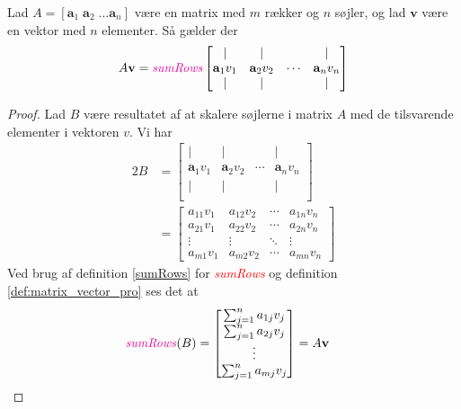 \begin{theorem} \label{matrix_vector_pro}
    Lad $A = [\mathbf{a}_1\; \mathbf{a}_2\; \hdots \mathbf{a}_n]$ være en matrix med $m$ rækker og $n$ søjler, og lad $\mathbf{v}$ være en vektor med $n$ elementer. Så gælder der
    \[ A\mathbf{v} = \textit{\textcolor{red}{sumRows}}
    \begin{bmatrix}
        | & | &        & | \\
        \mathbf{a}_{1}v_{1} & \mathbf{a}_{2}v_{2} & \cdots & \mathbf{a}_{n}v_{n} \\
        | & | &        & | \\
    \end{bmatrix}
    \]
\end{theorem}
\begin{proof}
    Lad $B$ være resultatet af at skalere søjlerne i matrix $A$ med de tilsvarende elementer i vektoren $v$. Vi har
    \begin{alignat*}{2}
    B &= 
    \begin{bmatrix}
        | & | &        & | \\
        \mathbf{a}_{1}v_{1} & \mathbf{a}_{2}v_{2} & \cdots & \mathbf{a}_{n}v_{n} \\
        | & | &        & | \\
    \end{bmatrix} \\
    &= \begin{bmatrix}
        a_{11}v_{1} & a_{12}v_{2} & \cdots & a_{1n}v_{n} \\
        a_{21}v_{1} & a_{22}v_{2} & \cdots & a_{2n}v_{n} \\
        \vdots & \vdots & \ddots & \vdots \\
        a_{m1}v_{1} & a_{m2}v_{2} & \cdots & a_{mn}v_{n}
    \end{bmatrix}
    \end{alignat*}
    Ved brug af definition \ref{sumRows} for \textit{\textcolor{red}{sumRows}} og definition \ref{def:matrix_vector_pro} ses det at 
    \begin{alignat*}{2}
    \text{{\color{red}\textit{sumRows}}}(B) &= \begin{bmatrix}
        \sum_{j=1}^{n} a_{1j}v_{j} \\
        \sum_{j=1}^{n} a_{2j}v_{j} \\
        \vdots \\
        \sum_{j=1}^{n} a_{mj}v_{j}
    \end{bmatrix} = A\mathbf{v}
    \end{alignat*}
\end{proof}

